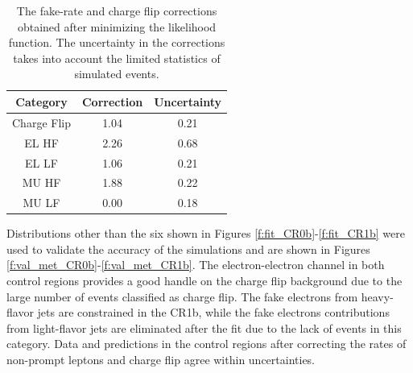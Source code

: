 \begin{table}[htb]
  \caption{The fake-rate and charge flip corrections obtained after minimizing the likelihood function.
The uncertainty in the corrections takes into account the limited statistics of simulated events.
  \label{t:fake_factors}}
  \centering
  \begin{tabular}{|c|c|c|}
    \hline
    Category & Correction & Uncertainty  \\
    \hline
    Charge Flip        &    1.04    &   0.21    \\
    EL HF              &    2.26    &   0.68    \\
    EL LF              &    1.06    &   0.21    \\
    MU HF              &    1.88    &   0.22    \\
    MU LF              &    0.00    &   0.18    \\
    \hline
  \end{tabular}
 \end{table}

Distributions other than the six shown in Figures \ref{f:fit_CR0b}-\ref{f:fit_CR1b} were used to validate the accuracy of the simulations 
and are shown in Figures \ref{f:val_met_CR0b}-\ref{f:val_met_CR1b}. 
The electron-electron channel in both control regions provides a good handle on the charge flip background due to the large number of events classified as charge flip.  
The fake electrons from heavy-flavor jets are constrained in the CR1b, while the fake electrons contributions from light-flavor jets are eliminated after the fit due to the lack of events in this category. 
Data and predictions in the control regions after correcting the rates of non-prompt leptons and charge flip agree within uncertainties.

